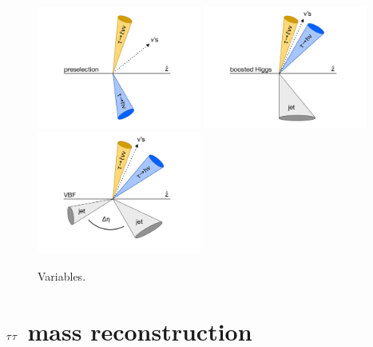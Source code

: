 \begin{figure}[tp]
  \centering
  \includegraphics[width=0.48\textwidth]{figures/category-cartoons/presel}
  \includegraphics[width=0.48\textwidth]{figures/category-cartoons/boost}
  \includegraphics[width=0.48\textwidth]{figures/category-cartoons/vbf}
  \caption{Variables.}
  \label{fig:strategy-category-cartoons}
\end{figure}

\section{$\tau\tau$ mass reconstruction}
\label{sec:strategy-mtautau}

